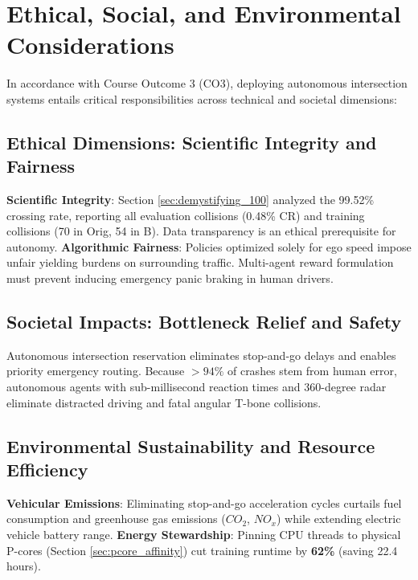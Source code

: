 \chapter{Ethical, Social, and Environmental Considerations}
\label{ch:ethics}

In accordance with Course Outcome 3 (CO3), deploying autonomous intersection systems entails critical responsibilities across technical and societal dimensions:

\vspace{-0.3cm}
\section{Ethical Dimensions: Scientific Integrity and Fairness}
\textbf{Scientific Integrity}: Section \ref{sec:demystifying_100} analyzed the 99.52\% crossing rate, reporting all evaluation collisions (0.48\% CR) and training collisions (70 in Orig, 54 in B). Data transparency is an ethical prerequisite for autonomy.
\textbf{Algorithmic Fairness}: Policies optimized solely for ego speed impose unfair yielding burdens on surrounding traffic. Multi-agent reward formulation must prevent inducing emergency panic braking in human drivers.

\vspace{-0.3cm}
\section{Societal Impacts: Bottleneck Relief and Safety}
Autonomous intersection reservation eliminates stop-and-go delays and enables priority emergency routing. Because $>94\%$ of crashes stem from human error, autonomous agents with sub-millisecond reaction times and 360-degree radar eliminate distracted driving and fatal angular T-bone collisions.

\vspace{-0.3cm}
\section{Environmental Sustainability and Resource Efficiency}
\textbf{Vehicular Emissions}: Eliminating stop-and-go acceleration cycles curtails fuel consumption and greenhouse gas emissions ($CO_2$, $NO_x$) while extending electric vehicle battery range.
\textbf{Energy Stewardship}: Pinning CPU threads to physical P-cores (Section \ref{sec:pcore_affinity}) cut training runtime by \textbf{62\%} (saving 22.4 hours).

